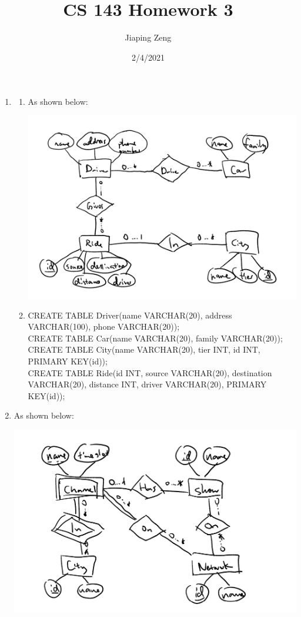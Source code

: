 \documentclass{article}
\title{CS 143 Homework 3}
\date{2/4/2021}
\author{Jiaping Zeng}
\begin{document}
\maketitle

\begin{enumerate}
    \item \begin{enumerate}
              \item As shown below:
                    \begin{center}
                        \includegraphics[width=6in]{1a.png}
                    \end{center}
              \item CREATE TABLE Driver(name VARCHAR(20), address VARCHAR(100), phone VARCHAR(20));\\CREATE TABLE Car(name VARCHAR(20), family VARCHAR(20));\\CREATE TABLE City(name VARCHAR(20), tier INT, id INT, PRIMARY KEY(id));\\CREATE TABLE Ride(id INT, source VARCHAR(20), destination VARCHAR(20), distance INT, driver VARCHAR(20), PRIMARY KEY(id));
          \end{enumerate}
    \item As shown below:
          \begin{center}
              \includegraphics[width=6in]{2.png}

\end{center}
\end{enumerate}
\end{document}
